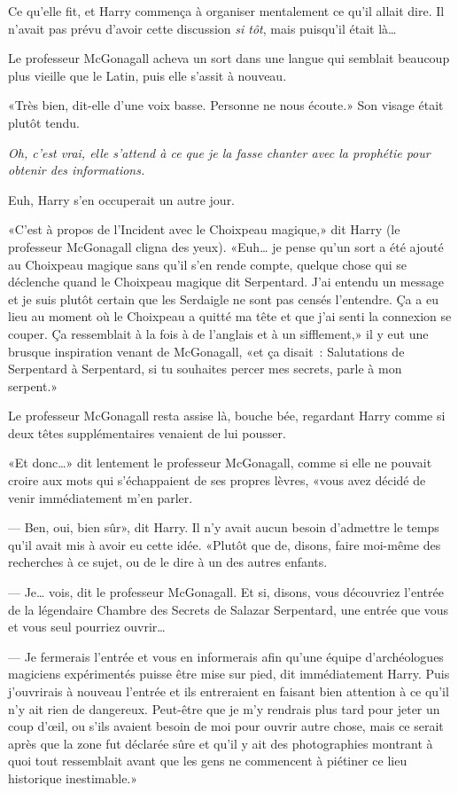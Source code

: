 Ce qu'elle fit, et Harry commença à organiser mentalement ce qu'il allait dire. Il n'avait pas prévu d'avoir cette discussion \emph{si tôt}, mais puisqu'il était là…

Le professeur McGonagall acheva un sort dans une langue qui semblait beaucoup plus vieille que le Latin, puis elle s'assit à nouveau.

«Très bien, dit-elle d'une voix basse. Personne ne nous écoute.» Son visage était plutôt tendu.

\emph{Oh, c'est vrai, elle s'attend à ce que je la fasse chanter avec la prophétie pour obtenir des informations.}

Euh, Harry s'en occuperait un autre jour.

«C'est à propos de l'Incident avec le Choixpeau magique,» dit Harry (le professeur McGonagall cligna des yeux). «Euh… je pense qu'un sort a été ajouté au Choixpeau magique sans qu'il s'en rende compte, quelque chose qui se déclenche quand le Choixpeau magique dit Serpentard. J'ai entendu un message et je suis plutôt certain que les Serdaigle ne sont pas censés l'entendre. Ça a eu lieu au moment où le Choixpeau a quitté ma tête et que j'ai senti la connexion se couper. Ça ressemblait à la fois à de l'anglais et à un sifflement,» il y eut une brusque inspiration venant de McGonagall, «et ça disait~: Salutations de Serpentard à Serpentard, si tu souhaites percer mes secrets, parle à mon serpent.»

Le professeur McGonagall resta assise là, bouche bée, regardant Harry comme si deux têtes supplémentaires venaient de lui pousser.

«Et donc…» dit lentement le professeur McGonagall, comme si elle ne pouvait croire aux mots qui s'échappaient de ses propres lèvres, «vous avez décidé de venir immédiatement m'en parler.

--- Ben, oui, bien sûr», dit Harry. Il n'y avait aucun besoin d'admettre le temps qu'il avait mis à avoir eu cette idée. «Plutôt que de, disons, faire moi-même des recherches à ce sujet, ou de le dire à un des autres enfants.

--- Je… vois, dit le professeur McGonagall. Et si, disons, vous découvriez l'entrée de la légendaire Chambre des Secrets de Salazar Serpentard, une entrée que vous et vous seul pourriez ouvrir…

--- Je fermerais l'entrée et vous en informerais afin qu'une équipe d'archéologues magiciens expérimentés puisse être mise sur pied, dit immédiatement Harry. Puis j'ouvrirais à nouveau l'entrée et ils entreraient en faisant bien attention à ce qu'il n'y ait rien de dangereux. Peut-être que je m'y rendrais plus tard pour jeter un coup d'œil, ou s'ils avaient besoin de moi pour ouvrir autre chose, mais ce serait après que la zone fut déclarée sûre et qu'il y ait des photographies montrant à quoi tout ressemblait avant que les gens ne commencent à piétiner ce lieu historique inestimable.»

